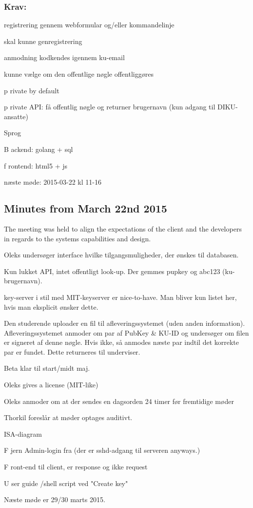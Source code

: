 \documentclass[11pt,a4paper]{article}
\let\OldItem\item
\newcommand{\SubItemStart}[1]{%
    \let\item\SubItemEnd
    \begin{SubItemList}[resume]%
        \OldItem #1%
}
\newcommand{\SubItemMiddle}[1]{%
    \OldItem #1%
}
\newcommand{\SubItemEnd}[1]{%
    \end{SubItemList}%
    \let\item\OldItem
    \item #1%
}
\newcommand*{\SubItem}[1]{%
    \let\SubItem\SubItemMiddle%
    \SubItemStart{#1}%
}%
\begin{document}
\subsubsection{Krav:}
\begin{itemize}
\item registrering gennem webformular og/eller kommandelinje
\item skal kunne genregistrering
\item anmodning kodkendes igennem ku-email
\item kunne vælge om den offentlige nøgle offentliggøres
\SubItem private by default
\item private API: få offentlig nøgle og returner brugernavn (kun adgang til DIKU-ansatte)
\item Sprog
\SubItem Backend: golang + sql
\SubItem frontend: html5 + js
\end{itemize}

næste møde:
2015-03-22 kl 11-16

\subsection{Minutes from March 22nd 2015}
The meeting was held to align the expectations of the client and the developers in regards to the systems capabilities and design.

\begin{itemize}
\item Oleks undersøger interface hvilke tilgangsmuligheder, der ønskes til databasen.
\item Kun lukket API, intet offentligt look-up. Der gemmes pupkey og abc123 (ku-brugernavn).
\item key-server i stil med MIT-keyserver er nice-to-have. Man bliver kun listet her, hvis man eksplicit ønsker dette.
\item Den studerende uploader en fil til afleveringssystemet (uden anden information). Afleveringssystemet anmoder om par af PubKey \& KU-ID og undersøger om filen er signeret af denne nøgle. Hvis ikke, så anmodes næste par indtil det korrekte par er fundet. Dette returneres til underviser.
\item Beta klar til start/midt maj.
\item Oleks gives a license (MIT-like)
\item Oleks anmoder om at der sendes en dagsorden 24 timer før fremtidige møder
\item Thorkil foreslår at møder optages auditivt.
\item ISA-diagram
\SubItem Fjern Admin-login fra (der er sshd-adgang til serveren anyways.)
\SubItem Front-end til client, er response og ikke request
\SubItem User guide /shell script ved "Create key"
\item
\end{itemize}

Næste møde er 29/30 marts 2015.
\end{document}
